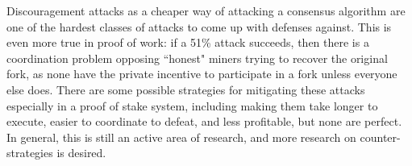 \documentclass[12pt]{article}
\begin{document}
Discouragement attacks as a cheaper way of attacking a consensus algorithm are one of the hardest classes of attacks to come up with defenses against. This is even more true in proof of work: if a 51\% attack succeeds, then there is a coordination problem opposing ``honest" miners trying to recover the original fork, as none have the private incentive to participate in a fork unless everyone else does. There are some possible strategies for mitigating these attacks especially in a proof of stake system, including making them take longer to execute, easier to coordinate to defeat, and less profitable, but none are perfect. In general, this is still an active area of research, and more research on counter-strategies is desired.



\end{document}
